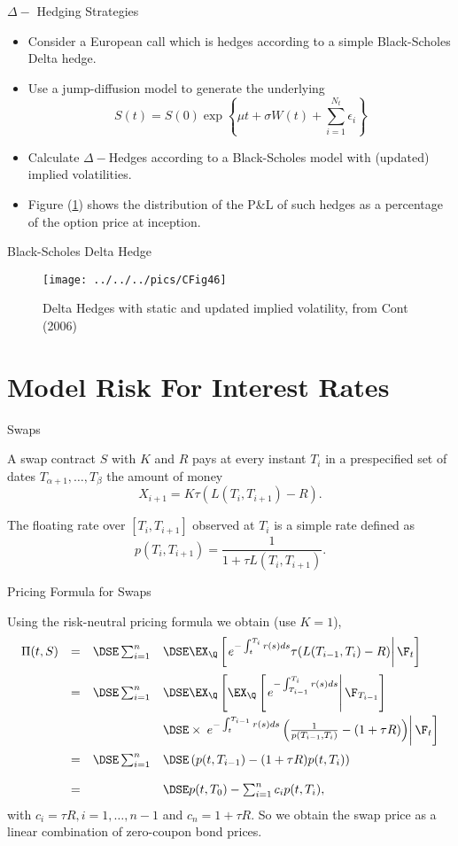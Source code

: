 {$\Delta-$ Hedging Strategies}
\begin{itemize}
\item<1-> Consider a European call which is hedges according to a simple Black-Scholes Delta hedge.
\item<2->
Use a jump-diffusion model to generate the underlying
$$
 S(t)=S(0) \exp\left\{\mu t + \sigma  W(t) + \sum_{i=1}^{N_t} \epsilon_i\right\}
$$
\item<3->
Calculate $\Delta-$Hedges according to a Black-Scholes model with (updated) implied volatilities.
\item<4->
Figure (\ref{CFig46}) shows the distribution of the P\&L of such hedges as a percentage of the option price at inception.
\end{itemize}

{Black-Scholes Delta Hedge}
\begin{figure}[htp]
\centering
\texttt{[image: ../../../pics/CFig46]}
\caption{Delta Hedges with static and updated implied volatility, from Cont (2006)}\label{CFig46}
\end{figure}

\section{Model Risk For Interest Rates}

{ Swaps}

A swap contract $S$ with $K$ and $R$ pays
at every instant $T_i$ in a prespecified set of dates
$T_{\alpha+1},\ldots ,T_{\beta}$
 the amount of money
$$
X_{i+1} = K \tau(L(T_i,T_{i+1})-R).
$$

The floating rate over $[T_i, T_{i+1}]$ observed at $T_i$ is a
simple rate defined as
$$
p(T_i, T_{i+1}) = \frac{1}{1 + \tau L(T_i,T_{i+1})}.
$$

{Pricing Formula for  Swaps}

Using the risk-neutral pricing  formula we obtain (use $K=1$),
{\tiny
$$
\begin{array}{llll}
\Pi(t,S) &=& \DSE \sum_{i=1}^n &\DSE \EX_{\Q}\left[\left.e^{-
\int_t^{T_i} r(s)ds} \tau(L(T_{i-1},T_{i})-R)\right|\F_t\right]\\*[12pt]
&=&\DSE \sum_{i=1}^n &\DSE \EX_{\Q}\left[\EX_{\Q}\left[\left.e^{-
\int_{T_{i-1}}^{T_i}
r(s)ds}\right|\F_{T_{i-1}}\right]\right.\\*[12pt] & & &\DSE \times
\left. \left.e^{- \int_t^{T_{i-1}} r(s)ds}
\left(\frac{1}{p(T_{i-1},T_i)}-(1+ \tau
R)\right)\right|\F_t\right]\\*[12pt] &=&\DSE \sum_{i=1}^n &\DSE
\left( p(t,T_{i-1})-(1 + \tau R) p(t,T_i)\right) \\*[12pt]
&=&&\DSE p(t,T_0) -
\sum_{i=1}^n c_i p(t,T_i),
\end{array}
$$
}
with $c_i=\tau R, i=1, \ldots, n-1$ and $c_n = 1+\tau R$. So we obtain the
swap price as a linear combination of zero-coupon bond prices.

